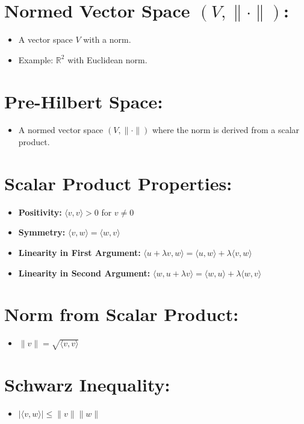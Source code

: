 \documentclass{article}
\begin{document}
\section{Normed Vector Space $(V, \| \cdot \|)$:}
\begin{itemize}
    \item A vector space $V$ with a norm.
    \item Example: $\mathbb{R}^2$ with Euclidean norm.
\end{itemize}


\section{Pre-Hilbert Space:}
\begin{itemize}
    \item A normed vector space $(V, \|\cdot\|)$ where the norm is derived from a scalar product.
\end{itemize}

\section{Scalar Product Properties:}
\begin{itemize}
    \item \textbf{Positivity:} $\langle v, v \rangle > 0$ for $v \neq 0$
    \item \textbf{Symmetry:} $\langle v, w \rangle = \langle w, v \rangle$
    \item \textbf{Linearity in First Argument:} $\langle u + \lambda v, w \rangle = \langle u, w \rangle + \lambda \langle v, w \rangle$
    \item \textbf{Linearity in Second Argument:} $\langle w, u + \lambda v \rangle = \langle w, u \rangle + \lambda \langle w, v \rangle$
\end{itemize}

\section{Norm from Scalar Product:}
\begin{itemize}
    \item $\|v\| = \sqrt{\langle v, v \rangle}$
\end{itemize}

\section{Schwarz Inequality:}
\begin{itemize}
    \item $|\langle v, w \rangle| \leq \|v\| \|w\|$
\end{itemize}
\end{document}
